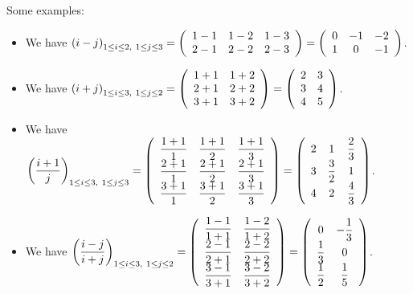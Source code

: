 \documentclass[numbers=enddot,12pt,final,onecolumn,notitlepage]{scrartcl}%
\theoremstyle{definition}
\begin{document}
Some examples:

\begin{itemize}
\item We have $\left(  i-j\right)  _{1\leq i\leq2,\ 1\leq j\leq3}=\left(
\begin{array}
[c]{ccc}%
1-1 & 1-2 & 1-3\\
2-1 & 2-2 & 2-3
\end{array}
\right)  =\left(
\begin{array}
[c]{ccc}%
0 & -1 & -2\\
1 & 0 & -1
\end{array}
\right)  $.

\item We have $\left(  i+j\right)  _{1\leq i\leq3,\ 1\leq j\leq2}=\left(
\begin{array}
[c]{cc}%
1+1 & 1+2\\
2+1 & 2+2\\
3+1 & 3+2
\end{array}
\right)  =\left(
\begin{array}
[c]{cc}%
2 & 3\\
3 & 4\\
4 & 5
\end{array}
\right)  $.

\item We have $\left(  \dfrac{i+1}{j}\right)  _{1\leq i\leq3,\ 1\leq j\leq
3}=\left(
\begin{array}
[c]{ccc}%
\dfrac{1+1}{1} & \dfrac{1+1}{2} & \dfrac{1+1}{3}\\
\dfrac{2+1}{1} & \dfrac{2+1}{2} & \dfrac{2+1}{3}\\
\dfrac{3+1}{1} & \dfrac{3+1}{2} & \dfrac{3+1}{3}%
\end{array}
\right)  =\left(
\begin{array}
[c]{ccc}%
2 & 1 & \dfrac{2}{3}\\
3 & \dfrac{3}{2} & 1\\
4 & 2 & \dfrac{4}{3}%
\end{array}
\right)  $.

\item We have $\left(  \dfrac{i-j}{i+j}\right)  _{1\leq i\leq3,\ 1\leq j\leq
2}=\left(
\begin{array}
[c]{cc}%
\dfrac{1-1}{1+1} & \dfrac{1-2}{1+2}\\
\dfrac{2-1}{2+1} & \dfrac{2-2}{2+2}\\
\dfrac{3-1}{3+1} & \dfrac{3-2}{3+2}%
\end{array}
\right)  =\left(
\begin{array}
[c]{cc}%
0 & -\dfrac{1}{3}\\
\dfrac{1}{3} & 0\\
\dfrac{1}{2} & \dfrac{1}{5}%
\end{array}
\right)  $.
\end{itemize}
\end{document}
